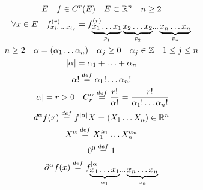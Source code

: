 \documentclass[main]{subfiles}
\begin{document}
    \begin{gather*}
        E \quad f \in C^r(E) \quad E \subset \mathbb{R}^n \quad n \geq 2 \\
        \forall x \in E \quad f^{(r)}_{x_{i_1} \ldots x_{i_r}} = f^{(r)}_{\underbrace{x_1 \ldots x_1}_{P_1} \underbrace{x_2 \ldots x_2}_{P_2} \ldots \underbrace{x_n \ldots x_n}_{P_n}} \\
        n \geq 2 \quad \alpha = (\alpha_1 \ldots \alpha_n) \quad \alpha_j \geq 0 \quad \alpha_j \in \mathbb{Z} \quad 1 \leq j \leq n \\
        |\alpha| = \alpha_1 + \ldots + \alpha_n \\
        \alpha! \stackrel{def}{=} \alpha_1! \ldots \alpha_n! \\
        |\alpha| = r > 0 \quad C^\alpha_r \stackrel{def}{=} \frac{r!}{\alpha!} = \frac{r!}{\alpha_1! \ldots \alpha_n!} \\
        d^{\alpha}f(x) \stackrel{def}{=} f^{|\alpha|}
        X = (X_1 \ldots X_n) \in \mathbb{R}^n \\
        X^\alpha \stackrel{def}{=} X_1^{\alpha_1} \ldots X_n^{\alpha_n} \\
        0^0 \stackrel{def}{=} 1 \\
        \partial^{\alpha}f(x) \stackrel{def}{=} f^{|\alpha|}_{\underbrace{x_1 \ldots x_1}_{\alpha_1} \ldots \underbrace{x_n \ldots x_n}_{\alpha_n}} 
    \end{gather*}
\end{document}
